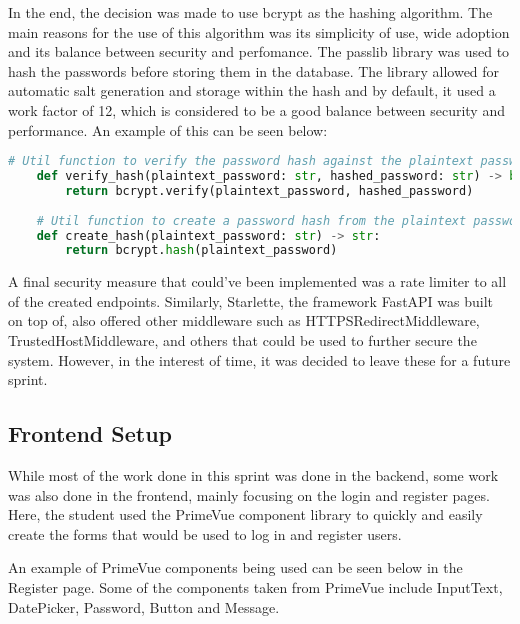 In the end, the decision was made to use bcrypt as the hashing algorithm. The main reasons for the use of this algorithm was its simplicity of use, wide adoption and its balance between security and perfomance. The passlib library was used to hash the passwords before storing them in the database. The library allowed for automatic salt generation and storage within the hash and by default, it used a work factor of 12, which is considered to be a good balance between security and performance. An example of this can be seen below:

\begin{lstlisting}[language=Python, caption=Hashing passwords with bcrypt]
    # Util function to verify the password hash against the plaintext password
    def verify_hash(plaintext_password: str, hashed_password: str) -> bool:
        return bcrypt.verify(plaintext_password, hashed_password)
    
    # Util function to create a password hash from the plaintext password
    def create_hash(plaintext_password: str) -> str:
        return bcrypt.hash(plaintext_password)
\end{lstlisting}

A final security measure that could've been implemented was a rate limiter to all of the created endpoints. Similarly, Starlette, the framework FastAPI was built on top of, also offered other middleware such as HTTPSRedirectMiddleware, TrustedHostMiddleware, and others that could be used to further secure the system. However, in the interest of time, it was decided to leave these for a future sprint.

\subsection{Frontend Setup}

While most of the work done in this sprint was done in the backend, some work was also done in the frontend, mainly focusing on the login and register pages. Here, the student used the PrimeVue component library to quickly and easily create the forms that would be used to log in and register users.

An example of PrimeVue components being used can be seen below in the Register page. Some of the components taken from PrimeVue include InputText, DatePicker, Password, Button and Message. 


